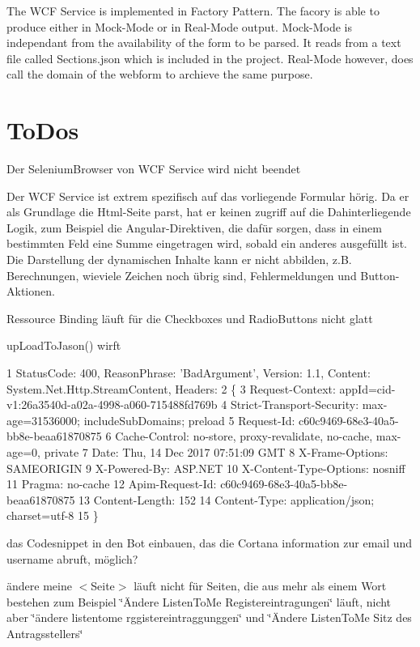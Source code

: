 The W\+CF Service is implemented in Factory Pattern. The facory is able to produce either in Mock-\/\+Mode or in Real-\/\+Mode output. Mock-\/\+Mode is independant from the availability of the form to be parsed. It reads from a text file called Sections.\+json which is included in the project. Real-\/\+Mode however, does call the domain of the webform to archieve the same purpose.\hypertarget{index_third}{}\section{To\+Dos}\label{index_third}

\begin{DoxyItemize}
\item Der Selenium\+Browser von W\+CF Service wird nicht beendet
\item Der W\+CF Service ist extrem spezifisch auf das vorliegende Formular hörig. Da er als Grundlage die Html-\/\+Seite parst, hat er keinen zugriff auf die Dahinterliegende Logik, zum Beispiel die Angular-\/\+Direktiven, die dafür sorgen, dass in einem bestimmten Feld eine Summe eingetragen wird, sobald ein anderes ausgefüllt ist. Die Darstellung der dynamischen Inhalte kann er nicht abbilden, z.\+B. Berechnungen, wieviele Zeichen noch übrig sind, Fehlermeldungen und Button-\/\+Aktionen.
\item Ressource Binding läuft für die Checkboxes und Radio\+Buttons nicht glatt
\item up\+Load\+To\+Jason() wirft
\end{DoxyItemize}


\begin{DoxyCode}
1 StatusCode: 400, ReasonPhrase: 'BadArgument', Version: 1.1, Content: System.Net.Http.StreamContent,
       Headers:
2 \{
3   Request-Context: appId=cid-v1:26a3540d-a02a-4998-a060-715488fd769b
4   Strict-Transport-Security: max-age=31536000; includeSubDomains; preload
5   Request-Id: c60c9469-68e3-40a5-bb8e-beaa61870875
6   Cache-Control: no-store, proxy-revalidate, no-cache, max-age=0, private
7   Date: Thu, 14 Dec 2017 07:51:09 GMT
8   X-Frame-Options: SAMEORIGIN
9   X-Powered-By: ASP.NET
10   X-Content-Type-Options: nosniff
11   Pragma: no-cache
12   Apim-Request-Id: c60c9469-68e3-40a5-bb8e-beaa61870875
13   Content-Length: 152
14   Content-Type: application/json; charset=utf-8
15 \}
\end{DoxyCode}



\begin{DoxyItemize}
\item das Codesnippet in den Bot einbauen, das die Cortana information zur email und username abruft, möglich?
\item ändere meine $<$\+Seite$>$ läuft nicht für Seiten, die aus mehr als einem Wort bestehen zum Beispiel \char`\"{}Ändere Listen\+To\+Me Registereintragungen\char`\"{} läuft, nicht aber \char`\"{}ändere listentome rggistereintraggunggen\char`\"{} und \char`\"{}Ändere Listen\+To\+Me Sitz des Antragsstellers\char`\"{}
\end{DoxyItemize}

